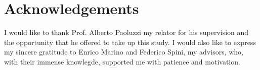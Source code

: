 \chapter{Acknowledgements}
\label{cha:acknowledgements}
I would like to thank Prof. Alberto Paoluzzi my relator for his supervision and the opportunity that he offered to take up this study. I would also like to express my sincere gratitude to Enrico Marino and Federico Spini, my advisors, who, with their immense knowlegde, supported me with patience and  motivation.